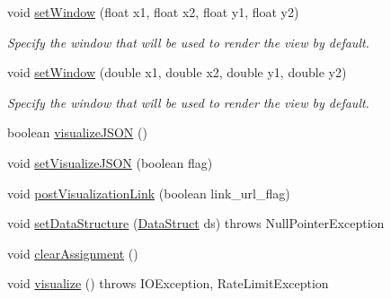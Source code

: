 \begin{DoxyCompactItemize}
void \hyperlink{classbridges_1_1connect_1_1_bridges_afff6882285f7615b775c59b2fc62b1c3}{set\+Window} (float x1, float x2, float y1, float y2)
\begin{DoxyCompactList}\small\item\em Specify the window that will be used to render the view by default. \end{DoxyCompactList}\item 
void \hyperlink{classbridges_1_1connect_1_1_bridges_a163a32a2fd3327c59d003f457e31eb63}{set\+Window} (double x1, double x2, double y1, double y2)
\begin{DoxyCompactList}\small\item\em Specify the window that will be used to render the view by default. \end{DoxyCompactList}\item 
boolean \hyperlink{classbridges_1_1connect_1_1_bridges_afd3c63780396e92c94c923037385b31d}{visualize\+J\+S\+ON} ()
\item 
void \hyperlink{classbridges_1_1connect_1_1_bridges_aa502aa32a9ac482da9c8455c6810b64d}{set\+Visualize\+J\+S\+ON} (boolean flag)
\item 
void \hyperlink{classbridges_1_1connect_1_1_bridges_a10661d820ca8c46028aa6d1eebe98a1e}{post\+Visualization\+Link} (boolean link\+\_\+url\+\_\+flag)
\item 
void \hyperlink{classbridges_1_1connect_1_1_bridges_a921a6603b2445b1abe30a1b3d6f0c255}{set\+Data\+Structure} (\hyperlink{classbridges_1_1base_1_1_data_struct}{Data\+Struct} ds)  throws Null\+Pointer\+Exception 
\item 
void \hyperlink{classbridges_1_1connect_1_1_bridges_ad79081ca241e5bcb77b1ed52a09fdd39}{clear\+Assignment} ()
\item 
void \hyperlink{classbridges_1_1connect_1_1_bridges_a1853d64ffb8675ba2ec227a2b819cd24}{visualize} ()  throws I\+O\+Exception, Rate\+Limit\+Exception 
\end{DoxyCompactItemize}
